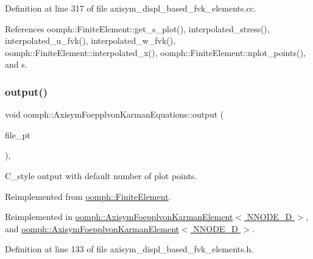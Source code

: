 Definition at line 317 of file axisym\+\_\+displ\+\_\+based\+\_\+fvk\+\_\+elements.\+cc.



References oomph\+::\+Finite\+Element\+::get\+\_\+s\+\_\+plot(), interpolated\+\_\+stress(), interpolated\+\_\+u\+\_\+fvk(), interpolated\+\_\+w\+\_\+fvk(), oomph\+::\+Finite\+Element\+::interpolated\+\_\+x(), oomph\+::\+Finite\+Element\+::nplot\+\_\+points(), and s.

\mbox{\label{classoomph_1_1AxisymFoepplvonKarmanEquations_a236f169caf08c0214ff686e939b9dd33}} 
\subsubsection{\texorpdfstring{output()}{output()}\hspace{0.1cm}{\footnotesize\ttfamily [7/8]}}
{\footnotesize\ttfamily void oomph\+::\+Axisym\+Foepplvon\+Karman\+Equations\+::output (\begin{DoxyParamCaption}\item[{F\+I\+LE $\ast$}]{file\+\_\+pt }\end{DoxyParamCaption})\hspace{0.3cm}{\ttfamily [inline]}, {\ttfamily [virtual]}}



C\+\_\+style output with default number of plot points. 



Reimplemented from \hyperlink{classoomph_1_1FiniteElement_a72cddd09f8ddbee1a20a1ff404c6943e}{oomph\+::\+Finite\+Element}.



Reimplemented in \hyperlink{classoomph_1_1AxisymFoepplvonKarmanElement_a17a94d66cf74c7be11d8e0a514db1d92}{oomph\+::\+Axisym\+Foepplvon\+Karman\+Element$<$ N\+N\+O\+D\+E\+\_\+D $>$}, and \hyperlink{classoomph_1_1AxisymFoepplvonKarmanElement_a17a94d66cf74c7be11d8e0a514db1d92}{oomph\+::\+Axisym\+Foepplvon\+Karman\+Element$<$ N\+N\+O\+D\+E\+\_\+D $>$}.



Definition at line 133 of file axisym\+\_\+displ\+\_\+based\+\_\+fvk\+\_\+elements.\+h.



